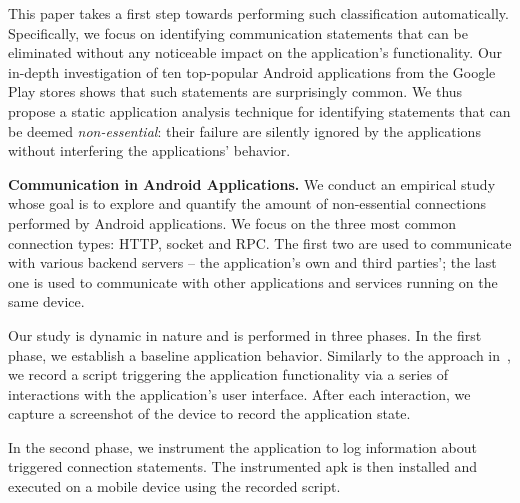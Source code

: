 This paper takes a first step towards performing such classification automatically. 
Specifically, we focus on identifying communication statements that can be eliminated without any noticeable impact on the application's functionality. 
Our in-depth investigation of ten top-popular Android applications from the Google Play stores shows that such statements are surprisingly common. 
We thus propose a static application analysis technique for identifying statements that can be deemed \emph{non-essential}: their failure are silently ignored by the applications
without interfering the applications' behavior. 

\vspace{0.1in}
\noindent 
{\bf Communication in Android Applications.}
We conduct an empirical study whose goal is to explore and quantify the amount of non-essential connections performed by Android applications. 
We focus on the three most common connection types: HTTP, socket and RPC.
The first two are used to communicate with various backend servers -- the application's own and third parties'; 
the last one is used to communicate with other applications and services running on the same device.

Our study is dynamic in nature and is performed in three phases. 
In the first phase, we establish a baseline application behavior. 
Similarly to the approach in~\cite{Hornyack:Han:Jung:Schechter:Wetherall:CCS11}, we record a script triggering the application functionality via a series of interactions with the application's user interface. 
After each interaction, we capture a screenshot of the device to record the application state. 

In the second phase, we instrument the application to log information about 
triggered connection statements. The instrumented apk is then installed and executed on a mobile device using the recorded script. 

